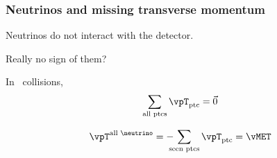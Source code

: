 \begin{frame}
\frametitle{Neutrinos and missing transverse momentum}

\manip Neutrinos do not interact with the detector.

\manip Really no sign of them?

\pause

\manip In \proton\proton\ collisions, %
\begin{equation*}
\sum_\text{all ptcs} \vpT_\text{ptc} = \vec{0}
\end{equation*}

\pause\bigskip
\begin{equation*}
\vpT^\text{all \neutrino} = - \!\!\!\! \sum_\text{seen ptcs} \vpT_\text{ptc} = \vMET
\end{equation*}

\end{frame}
